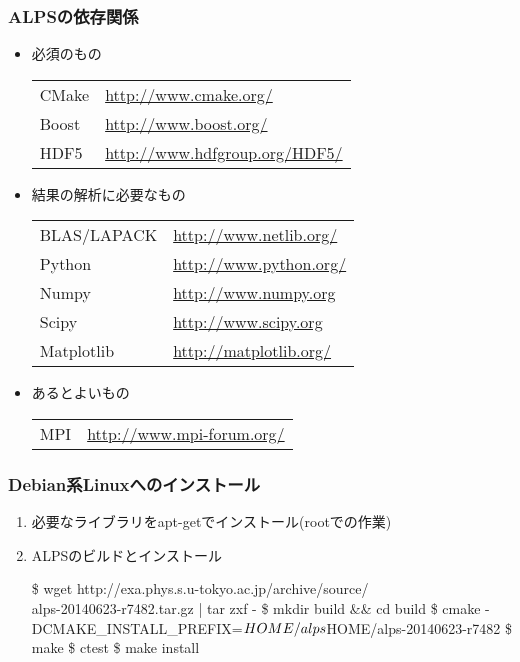 \begin{frame}
  \frametitle{ALPSの依存関係}
  \begin{itemize}
  \item 必須のもの\\
    \begin{tabular}{ll}
      CMake & \url{http://www.cmake.org/} \\
      Boost & \url{http://www.boost.org/} \\
      HDF5  & \url{http://www.hdfgroup.org/HDF5/} \\
    \end{tabular}
  \item 結果の解析に必要なもの \\
    \begin{tabular}{ll}
      BLAS/LAPACK & \url{http://www.netlib.org/} \\
      Python & \url{http://www.python.org/} \\
      Numpy & \url{http://www.numpy.org} \\
      Scipy & \url{http://www.scipy.org} \\
      Matplotlib & \url{http://matplotlib.org/}
    \end{tabular}
  \item あるとよいもの \\
    \begin{tabular}{ll}
      MPI & \url{http://www.mpi-forum.org/} \\
    \end{tabular}
  \end{itemize}
\end{frame}

\begin{frame}[fragile,shrink=10]
  \frametitle{Debian系Linuxへのインストール}
  \begin{enumerate}
  \item 必要なライブラリをapt-getでインストール(rootでの作業)
  \item ALPSのビルドとインストール
\begin{semiverbatim}
\$ wget http://exa.phys.s.u-tokyo.ac.jp/archive/source/\\
  alps-20140623-r7482.tar.gz | tar zxf -
\$ mkdir build && cd build
\$ cmake -DCMAKE_INSTALL_PREFIX=${HOME}/alps \\
  $HOME/alps-20140623-r7482
\$ make
\$ ctest
\$ make install
\end{semiverbatim}
  \end{enumerate}
\end{frame}

